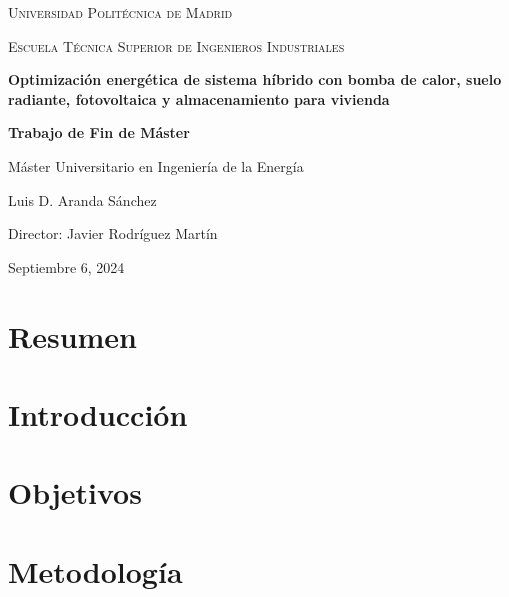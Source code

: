 \documentclass[a4paper,11pt,twoside]{report}
\begin{document}
\begin{titlepage}
    \centering
    {\scshape\LARGE Universidad Politécnica de Madrid \par}
    \vspace{1cm}
    {\scshape\Large Escuela Técnica Superior de Ingenieros Industriales\par}
    \vspace{1.5cm}
    {\huge\bfseries Optimización energética de sistema híbrido con bomba de calor, suelo radiante, fotovoltaica y almacenamiento para vivienda \par}
    \vspace{1.5cm}
    {\Large\bfseries Trabajo de Fin de Máster\par}
    \vspace{0.5cm}
    {\large Máster Universitario en Ingeniería de la Energía \par}
    \vspace{2cm}
    {\Large Luis D. Aranda Sánchez\par}
    \vfill
    Director: Javier Rodríguez Martín
    \vfill
    {\large Septiembre 6, 2024\par}
\end{titlepage}

\clearpage
\pagestyle{simple}
\chapter*{Resumen}


\clearpage
\pagestyle{simple}
\tableofcontents

\clearpage
\pagestyle{myfancy}
\newpage
\chapter{Introducción}


\chapter{Objetivos}


\chapter{Metodología}

\end{document}
